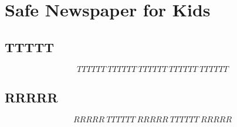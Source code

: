 \documentclass [12pt] {article}
\begin{document}
\section*{Safe Newspaper for Kids} \subsection{TTTTT}
\[
TTTTTT\ TTTTTT\ TTTTTT\ TTTTTT\ TTTTTT
\]
\subsection{RRRRR}
\[
RRRRR\ TTTTTT\ RRRRR\ TTTTTT\ RRRRR
\]
 
\end{document}
